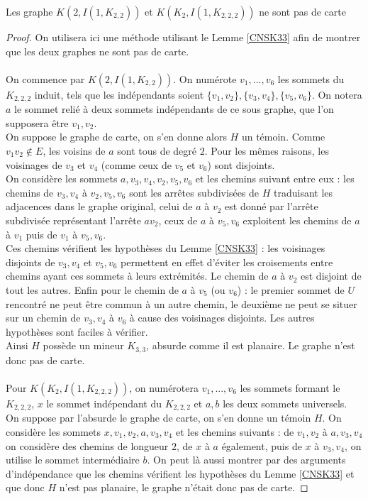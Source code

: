 \documentclass{scrartcl}
\begin{document}
\begin{flushleft}
\begin{lem*}[\ref{2connstrictForbid}]
    Les graphe $K(2, I(1, K_{2,2}))$ et $K(K_2, I(1, K_{2,2,2}))$ ne sont pas de carte
\end{lem*}

\begin{proof}
    On utilisera ici une méthode utilisant le Lemme \ref{CNSK33} afin de montrer que les deux graphes ne sont pas de carte.
    \\~\\
    On commence par $K(2, I(1, K_{2,2}))$.
    On numérote $v_1, ..., v_6$ les sommets du $K_{2,2,2}$ induit, tels que les indépendants soient $\{v_1, v_2\}, \{v_3,v_4\}, \{v_5,v_6\}$.
    On notera $a$ le sommet relié à deux sommets indépendants de ce sous graphe, que l'on supposera être $v_1, v_2$.\\
    On suppose le graphe de carte, on s'en donne alors $H$ un témoin. Comme $v_1v_2 \notin E$, les voisins de $a$ sont tous de degré
    $2$. Pour les mêmes raisons, les voisinages de $v_3$ et $v_4$ (comme ceux de $v_5$ et $v_6$) sont disjoints.\\
    On considère les sommets $a, v_3, v_4, v_2, v_5, v_6$ et les chemins suivant entre eux : les chemins de $v_3, v_4$ à $v_2, v_5, v_6$
    sont les arrêtes subdivisées de $H$ traduisant les adjacences dans le graphe original, celui de $a$ à $v_2$ est donné par l'arrête
    subdivisée représentant l'arrête $av_2$, ceux de $a$ à $v_5, v_6$ exploitent les chemins de $a$ à $v_1$ puis de $v_1$ à $v_5, v_6$.\\
    Ces chemins vérifient les hypothèses du Lemme \ref{CNSK33} : les voisinages disjoints de $v_3, v_4$ et $v_5, v_6$ permettent
    en effet d'éviter les croisements entre chemins ayant ces sommets à leurs extrémités. Le chemin de $a$ à $v_2$ est disjoint
    de tout les autres. Enfin pour le chemin de $a$ à $v_5$ (ou $v_6$) : le premier sommet de $U$ rencontré ne peut être commun à un autre
    chemin, le deuxième ne peut se situer sur un chemin de $v_3, v_4$ à $v_6$ à cause des voisinages disjoints. Les autres hypothèses sont
    faciles à vérifier.\\
    Ainsi $H$ possède un mineur $K_{3,3}$, absurde comme il est planaire. Le graphe n'est donc pas de carte.
    \\~\\
    Pour $K(K_2, I(1, K_{2,2,2}))$, on numérotera $v_1, ..., v_6$ les sommets formant le $K_{2,2,2}$, $x$ le sommet indépendant du $K_{2,2,2}$
    et $a, b$ les deux sommets universels. On suppose par l'absurde le graphe de carte, on s'en donne un témoin $H$. On considère les sommets
    $x, v_1, v_2, a, v_3, v_4$ et les chemins suivants : de $v_1, v_2$ à $a, v_3, v_4$ on considère des chemins de longueur $2$, de
    $x$ à $a$ également, puis de $x$ à $v_3, v_4$, on utilise le sommet intermédiaire $b$. On peut là aussi montrer par des arguments
    d'indépendance que les chemins vérifient les hypothèses du Lemme \ref{CNSK33} et que donc $H$ n'est pas planaire, le graphe
    n'était donc pas de carte.
\end{proof}


\end{flushleft}
\end{document}
